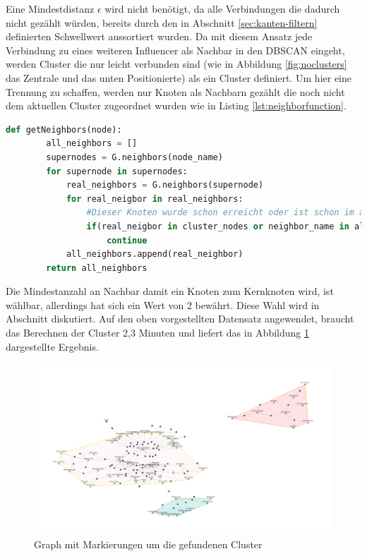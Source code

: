 Eine Mindestdistanz $\epsilon$ wird nicht benötigt, da alle Verbindungen die dadurch nicht gezählt würden, bereits durch den in Abschnitt \ref{sec:kanten-filtern} definierten Schwellwert aussortiert wurden.
Da mit diesem Ansatz jede Verbindung zu eines weiteren Influencer als Nachbar in den DBSCAN eingeht, werden \gls{Cluster} die nur leicht verbunden sind (wie in Abbildung \ref{fig:noclusters} das Zentrale und das unten Positionierte) als ein \gls{Cluster} definiert. 
Um hier eine Trennung zu schaffen, werden nur Knoten als Nachbarn gezählt die noch nicht dem aktuellen \gls{Cluster} zugeordnet wurden wie in Listing \ref{lst:neighborfunction}.
\begin{lstlisting}[language=Python,caption={Abwandlung der DBSCAN Nachbarfunktion},label={lst:neighborfunction}]
	def getNeighbors(node):
		all_neighbors = []
		supernodes = G.neighbors(node_name)
		for supernode in supernodes:
			real_neighbors = G.neighbors(supernode)
			for real_neigbor in real_neighbors:
				#Dieser Knoten wurde schon erreicht oder ist schon im aktuellen Cluster
				if(real_neigbor in cluster_nodes or neighbor_name in all_neighbors):
					continue
			all_neighbors.append(real_neighbor)
		return all_neighbors
\end{lstlisting}
Die Mindestanzahl an Nachbar damit ein Knoten zum Kernknoten wird, ist wählbar, allerdings hat sich ein Wert von 2 bewährt. Diese Wahl wird in Abschnitt diskutiert.
Auf den oben vorgestellten Datensatz angewendet, braucht das Berechnen der \gls{Cluster} 2,3 Minuten und liefert das in Abbildung \ref{fig:clustersscreenshot} dargestellte Ergebnis.
\begin{figure}[h!]
	\centering
	\includegraphics[width=\linewidth]{images/Clusters_screenshot}
	\caption{Graph mit Markierungen um die gefundenen \gls{Cluster}}
	\label{fig:clustersscreenshot}
\end{figure}

